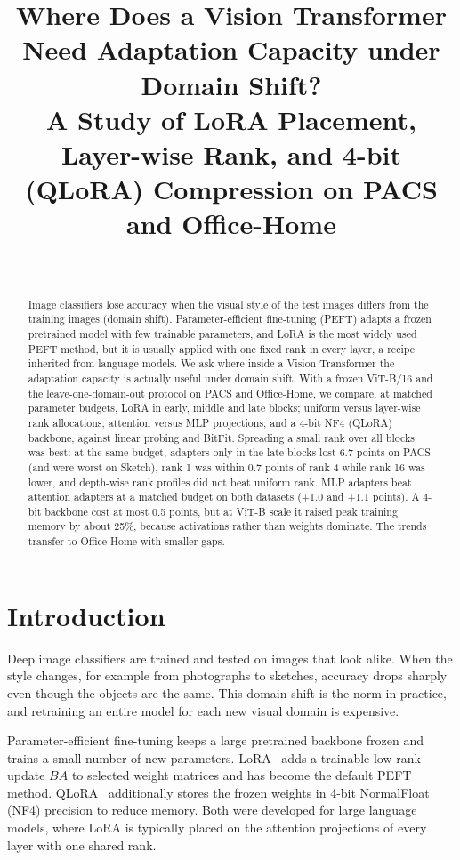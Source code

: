 \documentclass[10pt,twocolumn]{article}
\title{Where Does a Vision Transformer Need Adaptation Capacity under Domain Shift?\\
\large A Study of LoRA Placement, Layer-wise Rank, and 4-bit (QLoRA) Compression on PACS and Office-Home}
\author{\todo{Author name} \\ \todo{Affiliation}}
\date{}
\begin{document}
\maketitle

\begin{abstract}
Image classifiers lose accuracy when the visual style of the test images differs from the training images
(domain shift). Parameter-efficient fine-tuning (PEFT) adapts a frozen pretrained model with few trainable
parameters, and LoRA is the most widely used PEFT method, but it is usually applied with one fixed rank in every
layer, a recipe inherited from language models. We ask where inside a Vision Transformer the adaptation capacity
is actually useful under domain shift. With a frozen ViT-B/16 and the leave-one-domain-out protocol on PACS and
Office-Home, we compare, at matched parameter budgets, LoRA in early, middle and late blocks; uniform versus
layer-wise rank allocations; attention versus MLP projections; and a 4-bit NF4 (QLoRA) backbone, against linear
probing and BitFit. Spreading a small rank over all blocks was best: at the same budget, adapters only in the late blocks lost 6.7 points on PACS (and were worst on Sketch), rank 1 was within 0.7 points of rank 4 while rank 16 was lower, and depth-wise rank profiles did not beat uniform rank. MLP adapters beat attention adapters at a matched budget on both datasets (+1.0 and +1.1 points). A 4-bit backbone cost at most 0.5 points, but at ViT-B scale it raised peak training memory by about 25\%, because activations rather than weights dominate. The trends transfer to Office-Home with smaller gaps.
\end{abstract}

\section{Introduction}
Deep image classifiers are trained and tested on images that look alike. When the style changes, for example
from photographs to sketches, accuracy drops sharply even though the objects are the same. This domain shift is
the norm in practice, and retraining an entire model for each new visual domain is expensive.

Parameter-efficient fine-tuning keeps a large pretrained backbone frozen and trains a small number of new
parameters. LoRA~\cite{hu2021lora} adds a trainable low-rank update $BA$ to selected weight matrices and has
become the default PEFT method. QLoRA~\cite{dettmers2023qlora} additionally stores the frozen weights in 4-bit
NormalFloat (NF4) precision to reduce memory. Both were developed for large language models, where LoRA is
typically placed on the attention projections of every layer with one shared rank.
\end{document}
